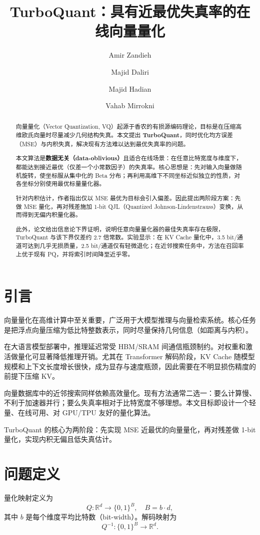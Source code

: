\documentclass[11pt]{ctexart}
\title{TurboQuant：具有近最优失真率的在线向量量化}
\author{
  Amir Zandieh \and
  Majid Daliri \and
  Majid Hadian \and
  Vahab Mirrokni
}
\date{}
\begin{document}
\maketitle

\begin{abstract}
向量量化（Vector Quantization, VQ）起源于香农的有损源编码理论，目标是在压缩高维欧氏向量时尽量减少几何结构失真。本文提出 \textbf{TurboQuant}，同时优化均方误差（MSE）与内积失真，解决现有方法难以达到最优失真率的问题。

本文算法是\textbf{数据无关（data-oblivious）}且适合在线场景：在任意比特宽度与维度下，都能达到接近最优（仅差一个小常数因子）的失真率。核心思想是：先对输入向量做随机旋转，使坐标服从集中化的 Beta 分布；再利用高维下不同坐标近似独立的性质，对各坐标分别使用最优标量量化器。

针对内积估计，作者指出仅以 MSE 最优为目标会引入偏差。因此提出两阶段方案：先做 MSE 量化，再对残差施加 1-bit QJL（Quantized Johnson-Lindenstrauss）变换，从而得到无偏内积量化器。

此外，论文给出信息论下界证明，说明任意向量量化器的最佳失真率存在极限，TurboQuant 与该下界仅差约 2.7 倍常数。实验显示：在 KV Cache 量化中，3.5 bit/通道可达到几乎无损质量，2.5 bit/通道仅有轻微退化；在近邻搜索任务中，方法在召回率上优于现有 PQ，并将索引时间降至近乎零。
\end{abstract}

\section{引言}
向量量化在高维计算中至关重要，广泛用于大模型推理与向量检索系统。核心任务是把浮点向量压缩为低比特整数表示，同时尽量保持几何信息（如距离与内积）。

在大语言模型部署中，推理延迟常受 HBM/SRAM 间通信瓶颈制约。对权重和激活做量化可显著降低推理开销。尤其在 Transformer 解码阶段，KV Cache 随模型规模和上下文长度增长很快，成为显存与速度瓶颈，因此需要在不明显损伤精度的前提下压缩 KV。

向量数据库中的近邻搜索同样依赖高效量化。现有方法通常二选一：要么计算慢、不利于加速器并行；要么失真率相对于比特宽度不够理想。本文目标即设计一个轻量、在线可用、对 GPU/TPU 友好的量化算法。

TurboQuant 的核心为两阶段：先实现 MSE 近最优的向量量化，再对残差做 1-bit 量化，实现内积无偏且低失真估计。

\section{问题定义}
量化映射定义为
\[
Q: \mathbb{R}^d \to \{0,1\}^B,\quad B=b\cdot d,
\]
其中 $b$ 是每个维度平均比特数（bit-width）。解码映射为
\[
Q^{-1}: \{0,1\}^B \to \mathbb{R}^d.
\]
\end{document}
